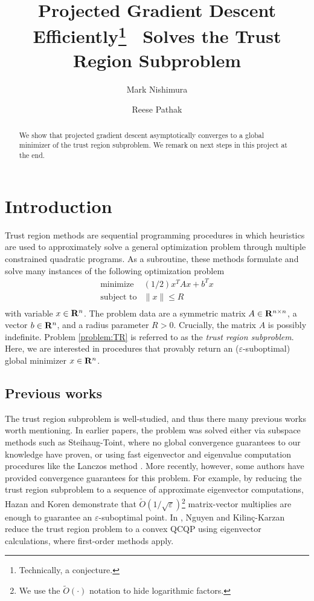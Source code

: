 \documentclass[11pt]{article}
\title{Projected Gradient Descent Efficiently\footnote{Technically, a conjecture.}~ Solves the Trust Region Subproblem}
\author{Mark Nishimura \and Reese Pathak}
\let\epsilon\varepsilon
\begin{document}
\maketitle

\begin{abstract}
We show that projected gradient descent asymptotically converges to a global minimizer of 
the trust region subproblem.
We remark on next steps in this project at the end.
\end{abstract}


\section{Introduction}
Trust region methods are sequential programming procedures in which heuristics are used to approximately solve a general optimization problem through multiple constrained quadratic programs. As a subroutine, these methods formulate and solve many instances of the following optimization problem
\begin{equation}\label{problem:TR}
\begin{array}{ll} 
\mbox{minimize} & (1/2)x^TAx + b^T x \\
\mbox{subject to} & 
\|x\| \leq R\\
\end{array}
\end{equation}
with variable $x \in \mathbf{R}^n$. 
The problem data are a symmetric matrix $A \in \mathbf{R}^{n \times n}$, a vector $b \in \mathbf{R}^n$, and a radius parameter $R > 0$. Crucially, the matrix $A$ is possibly indefinite. Problem \eqref{problem:TR} is 
referred to as the \emph{trust region subproblem}. Here,  
we are interested in procedures that provably return an ($\epsilon$-suboptimal) global minimizer $x \in \mathbf{R}^n$.

\subsection{Previous works}
The trust region subproblem is well-studied, and thus there many previous works worth mentioning. In earlier papers, the problem was solved either via subspace methods such as Steihaug-Toint, where no global convergence guarantees to our knowledge have proven, or using fast eigenvector and eigenvalue computation procedures like the Lanczos method \cite{conn2000, erway2009, gould1999, gould2010}. More recently, however, some authors have provided convergence guarantees for this problem. For example, by reducing the trust region subproblem to a sequence of approximate eigenvector computations, Hazan and Koren \cite{hazan2016}
demonstrate that $\tilde O(1/\sqrt{\epsilon})$\footnote{We use the $\tilde O(\cdot)$ notation to hide logarithmic factors.} matrix-vector multiplies are enough to guarantee an 
$\epsilon$-suboptimal point. In \cite{nguyen2017}, Nguyen and Kilin{\c{c}}{-}Karzan reduce the trust region problem to a convex QCQP using eigenvector calculations, where first-order methods apply. 
\end{document}
